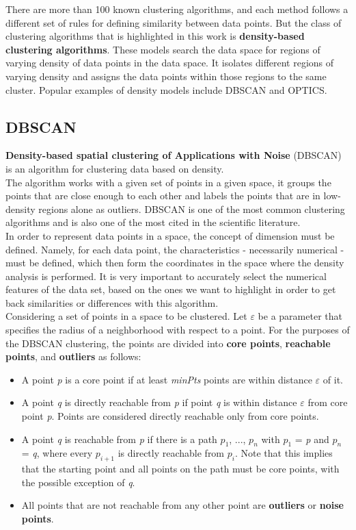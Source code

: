     There are more than 100 known clustering algorithms, and each method follows a different set of rules for defining similarity between data points. But the class of clustering algorithms that is highlighted in this work is \textbf{density-based clustering algorithms}. These models search the data space for regions of varying density of data points in the data space. It isolates different regions of varying density and assigns the data points within those regions to the same cluster. Popular examples of density models include DBSCAN and OPTICS.
    
    
    \subsection{DBSCAN}
    \textbf{Density-based spatial clustering of Applications with Noise} (DBSCAN) is an algorithm for clustering data based on density.
    \\
    The algorithm works with a given set of points in a given space, it groups the points that are close enough to each other and labels the points that are in low-density regions alone as outliers. DBSCAN is one of the most common clustering algorithms and is also one of the most cited in the scientific literature.
    \\
    In order to represent data points in a space, the concept of dimension must be defined. Namely, for each data point, the characteristics - necessarily numerical - must be defined, which then form the coordinates in the space where the density analysis is performed. It is very important to accurately select the numerical features of the data set, based on the ones we want to highlight in order to get back similarities or differences with this algorithm.
    \\
    Considering a set of points in a space to be clustered. Let $\varepsilon$ be a parameter that specifies the radius of a neighborhood with respect to a point.
    For the purposes of the DBSCAN clustering, the points are divided into \textbf{core points}, \textbf{reachable points}, and \textbf{outliers} as follows:
        
    \begin{itemize}
    \item A point \textit{p} is a core point if at least \textit{minPts} points are within distance $\varepsilon$ of it.
    \item A point \textit{q} is directly reachable from \textit{p} if point \textit{q} is within distance $\varepsilon$ from core point \textit{p}. Points are considered directly reachable only from core points.
    \item A point \textit{q} is reachable from \textit{p} if there is a path \textit{$p_1$}, ..., \textit{$p_n$} with \textit{$p_1$} = \textit{p} and \textit{$p_n$} = \textit{q}, where every \textit{$p_{i+1}$} is directly reachable from \textit{$p_i$}. Note that this implies that the starting point and all points on the path must be core points, with the possible exception of \textit{q}.
    \item All points that are not reachable from any other point are \textbf{outliers} or \textbf{noise points}.
    \end{itemize}
    
